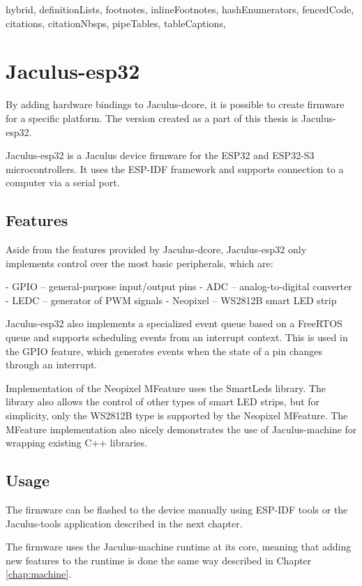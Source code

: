 \begin{markdown*}{%
  hybrid,
  definitionLists,
  footnotes,
  inlineFootnotes,
  hashEnumerators,
  fencedCode,
  citations,
  citationNbsps,
  pipeTables,
  tableCaptions,
}

\chapter{Jaculus-esp32}

By adding hardware bindings to Jaculus-dcore, it is possible to create firmware for a specific platform. The version created as a part of this thesis is Jaculus-esp32.

Jaculus-esp32 is a Jaculus device firmware for the ESP32 and ESP32-S3 microcontrollers. It uses the ESP-IDF framework and supports connection to a computer via a serial port.

\section{Features}

Aside from the features provided by Jaculus-dcore, Jaculus-esp32 only implements control over the most basic peripherals, which are:

  - GPIO -- general-purpose input/output pins
  - ADC -- analog-to-digital converter
  - LEDC -- generator of PWM signals
  - Neopixel -- WS2812B smart LED strip

Jaculus-esp32 also implements a specialized event queue based on a FreeRTOS queue and supports scheduling events from an interrupt context. This is used in the GPIO feature, which generates events when the state of a pin changes through an interrupt.

Implementation of the Neopixel MFeature uses the SmartLeds\cite{smartleds} library. The library also allows the control of other types of smart LED strips, but for simplicity, only the WS2812B type is supported by the Neopixel MFeature. The MFeature implementation also nicely demonstrates the use of Jaculus-machine for wrapping existing C++ libraries.

\section{Usage}

The firmware can be flashed to the device manually using ESP-IDF tools or the Jaculus-tools application described in the next chapter.

The firmware uses the Jaculus-machine runtime at its core, meaning that adding new features to the runtime is done the same way described in Chapter \ref{chap:machine}.

\end{markdown*}
